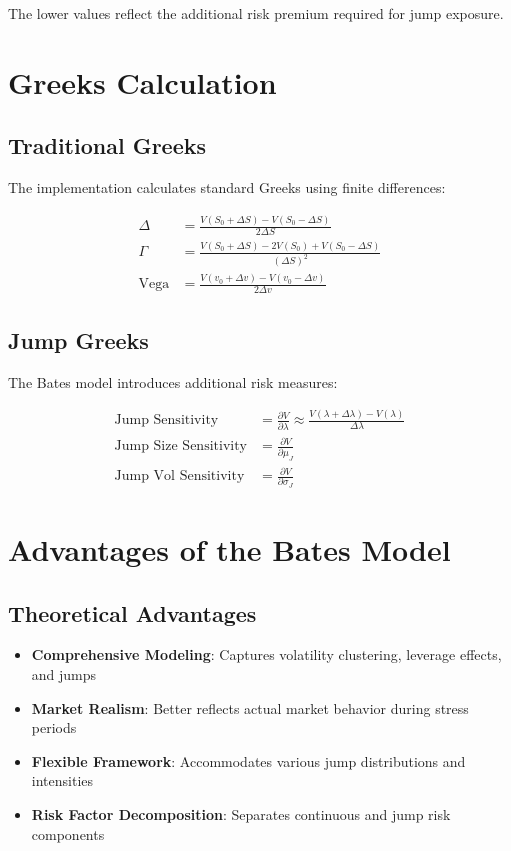 \documentclass[12pt,a4paper]{article}
\begin{document}
The lower values reflect the additional risk premium required for jump exposure.

\section{Greeks Calculation}

\subsection{Traditional Greeks}

The implementation calculates standard Greeks using finite differences:

\begin{align}
\Delta &= \frac{V(S_0 + \Delta S) - V(S_0 - \Delta S)}{2\Delta S}\\
\Gamma &= \frac{V(S_0 + \Delta S) - 2V(S_0) + V(S_0 - \Delta S)}{(\Delta S)^2}\\
\text{Vega} &= \frac{V(v_0 + \Delta v) - V(v_0 - \Delta v)}{2\Delta v}
\end{align}

\subsection{Jump Greeks}

The Bates model introduces additional risk measures:

\begin{align}
\text{Jump Sensitivity} &= \frac{\partial V}{\partial \lambda} \approx \frac{V(\lambda + \Delta\lambda) - V(\lambda)}{\Delta\lambda}\\
\text{Jump Size Sensitivity} &= \frac{\partial V}{\partial \mu_J}\\
\text{Jump Vol Sensitivity} &= \frac{\partial V}{\partial \sigma_J}
\end{align}

\section{Advantages of the Bates Model}

\subsection{Theoretical Advantages}

\begin{itemize}
    \item \textbf{Comprehensive Modeling}: Captures volatility clustering, leverage effects, and jumps
    \item \textbf{Market Realism}: Better reflects actual market behavior during stress periods
    \item \textbf{Flexible Framework}: Accommodates various jump distributions and intensities
    \item \textbf{Risk Factor Decomposition}: Separates continuous and jump risk components
\end{itemize}
\end{document}

